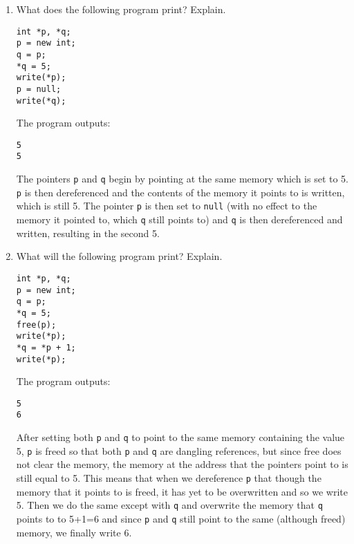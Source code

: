 \documentclass[11pt]{exam}
\begin{document}
\begin{questions}
        \begin{enumerate}[label=(\roman*)]
            \item What does the following program print? Explain.
                \begin{lstlisting}
int *p, *q;
p = new int;
q = p;
*q = 5;
write(*p);
p = null;
write(*q);
                \end{lstlisting}
                
                \begin{framed}
                    The program outputs:
                    \begin{lstlisting}
5
5
                    \end{lstlisting}
                    The pointers {\tt p} and {\tt q} begin by pointing at the same memory which is set to 5. {\tt p} is then dereferenced and the contents of the memory it points to is written, which is still 5. The pointer {\tt p} is then set to {\tt null} (with no effect to the memory it pointed to, which {\tt q} still points to) and {\tt q} is then dereferenced and written, resulting in the second 5.
                \end{framed}

            \item What will the following program print? Explain.
                \begin{lstlisting}
int *p, *q;
p = new int;
q = p;
*q = 5;
free(p);
write(*p);
*q = *p + 1;
write(*p);
                \end{lstlisting}

                \begin{framed}
                    The program outputs:
                    \begin{lstlisting}
5
6
                    \end{lstlisting}
                    After setting both {\tt p} and {\tt q} to point to the same memory containing the value 5, {\tt p} is freed so that both {\tt p} and {\tt q} are dangling references, but since free does not clear the memory, the memory at the address that the pointers point to is still equal to 5. This means that when we dereference {\tt p} that though the memory that it points to is freed, it has yet to be overwritten and so we write 5. Then we do the same except with {\tt q} and overwrite the memory that {\tt q} points to to 5+1=6 and since {\tt p} and {\tt q} still point to the same (although freed) memory, we finally write 6.

                \end{framed}
        

\end{enumerate}
\end{questions}
\end{document}
